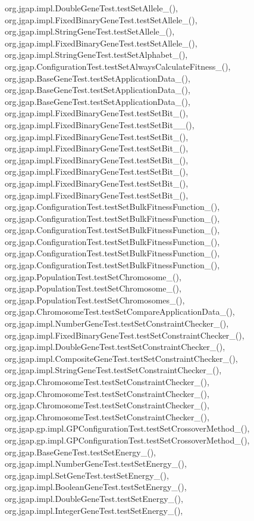 org.\-jgap.\-impl.\-Double\-Gene\-Test.\-test\-Set\-Allele\-\_(), org.\-jgap.\-impl.\-Fixed\-Binary\-Gene\-Test.\-test\-Set\-Allele\-\_(), org.\-jgap.\-impl.\-String\-Gene\-Test.\-test\-Set\-Allele\-\_(), org.\-jgap.\-impl.\-Fixed\-Binary\-Gene\-Test.\-test\-Set\-Allele\-\_(), org.\-jgap.\-impl.\-String\-Gene\-Test.\-test\-Set\-Alphabet\-\_(), org.\-jgap.\-Configuration\-Test.\-test\-Set\-Always\-Calculate\-Fitness\-\_(), org.\-jgap.\-Base\-Gene\-Test.\-test\-Set\-Application\-Data\-\_(), org.\-jgap.\-Base\-Gene\-Test.\-test\-Set\-Application\-Data\-\_(), org.\-jgap.\-Base\-Gene\-Test.\-test\-Set\-Application\-Data\-\_(), org.\-jgap.\-impl.\-Fixed\-Binary\-Gene\-Test.\-test\-Set\-Bit\-\_(), org.\-jgap.\-impl.\-Fixed\-Binary\-Gene\-Test.\-test\-Set\-Bit\-\_\-\_(), org.\-jgap.\-impl.\-Fixed\-Binary\-Gene\-Test.\-test\-Set\-Bit\-\_(), org.\-jgap.\-impl.\-Fixed\-Binary\-Gene\-Test.\-test\-Set\-Bit\-\_(), org.\-jgap.\-impl.\-Fixed\-Binary\-Gene\-Test.\-test\-Set\-Bit\-\_(), org.\-jgap.\-impl.\-Fixed\-Binary\-Gene\-Test.\-test\-Set\-Bit\-\_(), org.\-jgap.\-impl.\-Fixed\-Binary\-Gene\-Test.\-test\-Set\-Bit\-\_(), org.\-jgap.\-impl.\-Fixed\-Binary\-Gene\-Test.\-test\-Set\-Bit\-\_(), org.\-jgap.\-Configuration\-Test.\-test\-Set\-Bulk\-Fitness\-Function\-\_(), org.\-jgap.\-Configuration\-Test.\-test\-Set\-Bulk\-Fitness\-Function\-\_(), org.\-jgap.\-Configuration\-Test.\-test\-Set\-Bulk\-Fitness\-Function\-\_(), org.\-jgap.\-Configuration\-Test.\-test\-Set\-Bulk\-Fitness\-Function\-\_(), org.\-jgap.\-Configuration\-Test.\-test\-Set\-Bulk\-Fitness\-Function\-\_(), org.\-jgap.\-Configuration\-Test.\-test\-Set\-Bulk\-Fitness\-Function\-\_(), org.\-jgap.\-Population\-Test.\-test\-Set\-Chromosome\-\_(), org.\-jgap.\-Population\-Test.\-test\-Set\-Chromosome\-\_(), org.\-jgap.\-Population\-Test.\-test\-Set\-Chromosomes\-\_(), org.\-jgap.\-Chromosome\-Test.\-test\-Set\-Compare\-Application\-Data\-\_(), org.\-jgap.\-impl.\-Number\-Gene\-Test.\-test\-Set\-Constraint\-Checker\-\_(), org.\-jgap.\-impl.\-Fixed\-Binary\-Gene\-Test.\-test\-Set\-Constraint\-Checker\-\_(), org.\-jgap.\-impl.\-Double\-Gene\-Test.\-test\-Set\-Constraint\-Checker\-\_(), org.\-jgap.\-impl.\-Composite\-Gene\-Test.\-test\-Set\-Constraint\-Checker\-\_(), org.\-jgap.\-impl.\-String\-Gene\-Test.\-test\-Set\-Constraint\-Checker\-\_(), org.\-jgap.\-Chromosome\-Test.\-test\-Set\-Constraint\-Checker\-\_(), org.\-jgap.\-Chromosome\-Test.\-test\-Set\-Constraint\-Checker\-\_(), org.\-jgap.\-Chromosome\-Test.\-test\-Set\-Constraint\-Checker\-\_(), org.\-jgap.\-Chromosome\-Test.\-test\-Set\-Constraint\-Checker\-\_(), org.\-jgap.\-gp.\-impl.\-G\-P\-Configuration\-Test.\-test\-Set\-Crossover\-Method\-\_(), org.\-jgap.\-gp.\-impl.\-G\-P\-Configuration\-Test.\-test\-Set\-Crossover\-Method\-\_(), org.\-jgap.\-Base\-Gene\-Test.\-test\-Set\-Energy\-\_(), org.\-jgap.\-impl.\-Number\-Gene\-Test.\-test\-Set\-Energy\-\_(), org.\-jgap.\-impl.\-Set\-Gene\-Test.\-test\-Set\-Energy\-\_(), org.\-jgap.\-impl.\-Boolean\-Gene\-Test.\-test\-Set\-Energy\-\_(), org.\-jgap.\-impl.\-Double\-Gene\-Test.\-test\-Set\-Energy\-\_(), org.\-jgap.\-impl.\-Integer\-Gene\-Test.\-test\-Set\-Energy\-\_(), 
